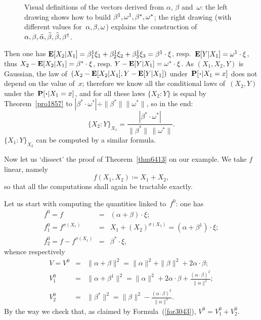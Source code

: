 \begin{figure}
%
\hspace{1em}\strut
%
\caption{Visual definitions of the vectors derived from $\alpha$, $\beta$ and~$\omega$:
the left drawing shows how to build $\beta^1,\allowbreak \omega^1,\allowbreak \beta^*,\allowbreak \omega^*$;
the right drawing (with different values for~$\alpha,\allowbreak \beta,\allowbreak \omega$) explains
the construction of~$\protect\bar\alpha,\ab \protect\bar\beta,\ab \protect\tilde\alpha,\ab \protect\tilde\beta,\ab \protect\hat\beta,\ab \beta^\dag$.}%
\label{fig-abo}
%
\end{figure}%
%
Then one has
$\mathop{\smash{\mathbf{E}}}\nolimits[X_2|X_1] = \beta^1_1\xi_1 + \beta^1_2\xi_2 + \beta^1_3\xi_3 = \beta^1\cdot\xi$,
resp.\ $\mathop{\smash{\mathbf{E}}}\nolimits[Y|X_1] = \omega^1\cdot\xi$,
thus $X_2-\mathop{\smash{\mathbf{E}}}\nolimits[X_2|X_1] = \beta^*\cdot\xi$,
resp. $Y-\mathop{\smash{\mathbf{E}}}\nolimits[Y|X_1] = \omega^*\cdot\xi$.
%
As $(X_1,X_2,Y)$ is Gaussian,
the law of~$(X_2-\mathop{\smash{\mathbf{E}}}\nolimits[X_2|X_1],\allowbreak {Y-\mathop{\smash{\mathbf{E}}}\nolimits[Y|X_1]})$
under~$\Pr[\Bcdot|\ab X_1=x]$ does not depend on the value of~$x$;
therefore we know all the conditional laws of~$(X_2,Y)$ under the~$\Pr[\Bcdot|X_1=x]$,
and for all these laws $\{X_2:Y\}$ is equal by Theorem~\ref{pro1857} to
$|\beta^*\cdot\omega^*| \div \|\beta^*\|\|\omega^*\|$, so in the end:
\[ \{ X_2:Y \}_{X_1} = \frac{|\beta^*\cdot\omega^*|}{\|\beta^*\|\,\|\omega^*\|} .\]
$\{ X_1:Y \}_{X_2}$ can be computed by a similar formula.

Now let us `dissect' the proof of Theorem~\ref{thm6413} on our example.
We take $f$ linear, namely
\[\label{forX1+X2} f(X_1,X_2) \coloneqq X_1 + X_2 ,\]
so that all the computations shall again be tractable exactly.

Let us start with computing the quantities linked to~$f^0$:
one has
\begin{eqnarray}
f^0 = f &=& (\alpha+\beta)\cdot\xi ;\\
f_1^0 = f^{\sigma(X_1)} &=& X_1 + (X_2)^{\sigma(X_1)} = (\alpha+\beta^1)\cdot\xi ;\\
f_2^0 = f - f^{\sigma(X_1)} &=& \beta^*\cdot\xi ,
\end{eqnarray}
whence respectively
\begin{eqnarray}
V = V^0 &=& \|\alpha+\beta\|^2 = \|\alpha\|^2 + \|\beta\|^2 + 2\alpha\cdot\beta ; \\
V_1^0 &=& \|\alpha+\beta^1\|^2 = \|\alpha\|^2 + 2\alpha\cdot\beta + \frac{(\alpha\cdot\beta)^2}{\|\alpha\|^2} ; \\
V_2^0 &=& \|\beta^*\|^2 = \|\beta\|^2 - \frac{(\alpha\cdot\beta)^2}{\|\alpha\|^2} .
\end{eqnarray}
By the way we check that, as claimed by Formula~(\ref{for3043}),
$V^0 = V_1^0 + V_2^0$.

